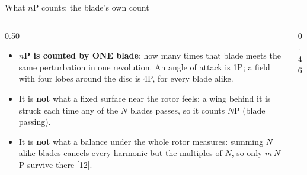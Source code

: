 \begin{frame}{What \(n\)P counts: the blade's own count}
\begin{columns}[T]
\begin{column}{0.50\textwidth}
\begin{itemize}\small
  \item \textbf{\(n\)P is counted by ONE blade}: how many times that blade
        meets the same perturbation in one revolution. An angle of attack
        is 1P; a field with four lobes around the disc is 4P, for every blade
        alike.
  \item It is \textbf{not} what a fixed surface near the rotor feels: a wing
        behind it is struck each time any of the \(N\) blades passes, so it
        counts \(N\)P (blade passing).
  \item It is \textbf{not} what a balance under the whole rotor measures:
        summing \(N\) alike blades cancels every harmonic but the multiples
        of \(N\), so only \(m\,N\)P survive there [12].
\end{itemize}
\end{column}
\begin{column}{0.46\textwidth}
\centering
{}
\end{column}
\end{columns}
\end{frame}


